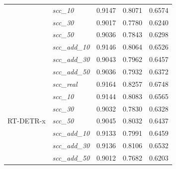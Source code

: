 \begin{table}[h!]
{\begin{tabular}{l|l|c|c|c}
                                      & \textit{scc\_10}        & \cellcolor{blue!10}0.9147  & 0.8071                     & 0.6574                     \\
                                      & \textit{scc\_30}        & 0.9017                     & 0.7780                     & 0.6240                     \\
                                      & \textit{scc\_50}        & 0.9036                     & 0.7843                     & 0.6298                     \\
                                      & \textit{scc\_add\_10}   & 0.9146                     & 0.8064                     & 0.6526                     \\
                                      & \textit{scc\_add\_30}   & 0.9043                     & 0.7962                     & 0.6457                     \\
                                      & \textit{scc\_add\_50}   & 0.9036                     & 0.7932                     & 0.6372                     \\
        \midrule
        \multirow[t]{7}{*}{RT-DETR-x} & \textit{scc\_real}      & \cellcolor{blue!10}0.9164  & \cellcolor{blue!10}0.8257  & \cellcolor{blue!10}0.6748  \\
                                      & \textit{scc\_10}        & 0.9144                     & 0.8083                     & 0.6565                     \\
                                      & \textit{scc\_30}        & 0.9032                     & 0.7830                     & 0.6328                     \\
                                      & \textit{scc\_50}        & 0.9045                     & 0.8032                     & 0.6437                     \\
                                      & \textit{scc\_add\_10}   & 0.9133                     & 0.7991                     & 0.6459                     \\
                                      & \textit{scc\_add\_30}   & 0.9136                     & 0.8106                     & 0.6532                     \\
                                      & \textit{scc\_add\_50}   & 0.9012                     & 0.7682                     & 0.6203                     \\
        \bottomrule
    \end{tabular}%
    }
\end{table}



